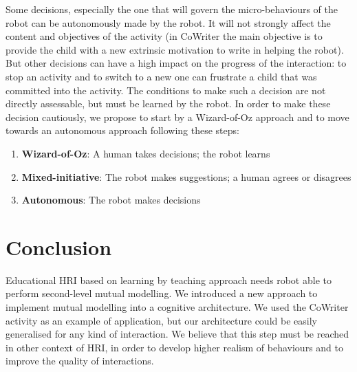 \documentclass[conference]{IEEEtran}
\begin{document}
Some decisions, especially the one that will govern the micro-behaviours of the robot can be autonomously made by the robot. It will not strongly affect the content and objectives of the activity (in CoWriter the main objective is to provide the child with a new extrinsic motivation to write in helping the robot). But other decisions can have a high impact on the progress of the interaction: to stop an activity and to switch to a new one can frustrate a child that was committed into the activity. The conditions to make such a decision are not directly assessable, but must be learned by the robot. In order to make these decision cautiously, we propose to start by a Wizard-of-Oz approach and to move towards an autonomous approach following these steps: 
\begin{enumerate}
\item \textbf{Wizard-of-Oz}: A human takes decisions; the robot learns
\item \textbf{Mixed-initiative}: The robot makes suggestions; a human agrees or disagrees
\item \textbf{Autonomous}: The robot makes decisions
\end{enumerate}



\section{Conclusion}

Educational HRI based on learning by teaching approach needs robot able to perform second-level mutual modelling. 
We introduced a new approach to implement mutual modelling into a cognitive architecture. We used the CoWriter activity
as an example of application, but our architecture could be easily generalised for any kind of interaction.
We believe that this step must be reached in other context of HRI, in order to develop higher realism of behaviours
and to improve the quality of interactions. 
\end{document}
